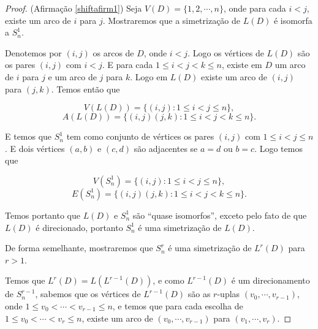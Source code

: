 \begin{proof}(Afirmação \ref{shiftafirm1})
Seja $V(D) = \{1,2,\cdots, n\}$, onde para cada $i < j$, existe um arco de $i$ para $j$. Mostraremos que a simetrização de $L(D)$ é isomorfa a $S_n^1$.

Denotemos por $(i,j)$ os arcos de $D$, onde $i < j$. Logo os vértices de $L(D)$ são os pares $(i,j)$ com $i < j$. E para cada $1 \leq i < j < k \leq n$, existe em $D$ um arco de $i$ para $j$ e um arco de $j$ para $k$. Logo em $L(D)$ existe um arco de $(i,j)$ para $(j,k)$. Temos então que

\[V(L(D)) = \{(i,j) : 1\leq i < j \leq n\},\]
\[A(L(D)) = \{(i,j)(j,k) : 1\leq i <j<k\leq n\}.\]

E temos que $S_n^1$ tem como conjunto de vértices os pares $(i,j)$ com $1\leq i<j\leq n$. E dois vértices $(a,b)$ e $(c,d)$ são adjacentes se $a = d$ ou $b = c$. Logo temos que

\[V(S_n^1) = \{(i,j) : 1\leq i<j\leq n\},\]
\[E(S_n^1) = \{(i,j)(j,k) : 1\leq i<j<k\leq n\}.\]

Temos portanto que $L(D)$ e $S_n^1$ são ``quase isomorfos'', exceto pelo fato de que $L(D)$ é direcionado, portanto $S_n^1$ é uma simetrização de $L(D)$.



De forma semelhante, mostraremos que $S_n^r$ é uma simetrização de $L^r(D)$ para $r>1$.

Temos que $L^r(D) = L(L^{r-1}(D))$, e como $L^{r-1}(D)$ é um direcionamento de $S_n^{r-1}$, sabemos que os vértices de $L^{r-1}(D)$ são as $r$-uplas $(v_0,\cdots,v_{r-1})$, onde $1\leq v_0 < \cdots < v_{r-1} \leq n$, e temos que para cada escolha de $1\leq v_0 < \cdots < v_{r} \leq n$, existe um arco de $(v_0,\cdots,v_{r-1})$ para $(v_1,\cdots,v_r)$.


\end{proof}
